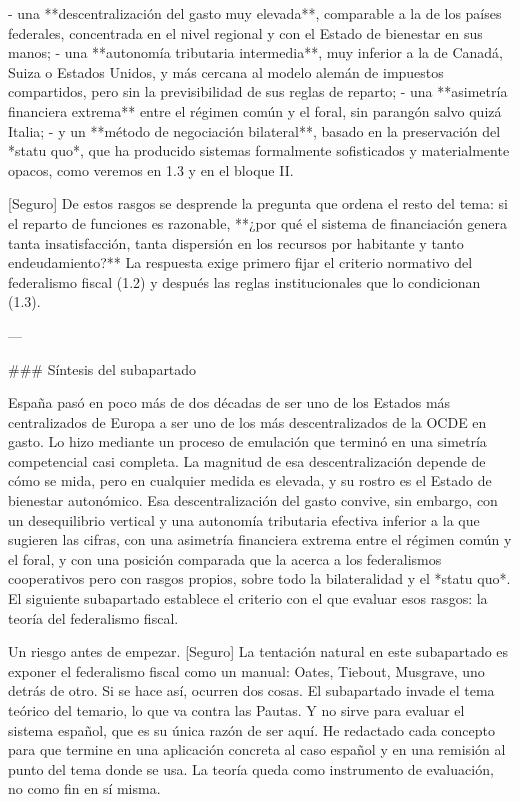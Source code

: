 \documentclass[10pt,a4paper]{article}
\begin{document}
- una **descentralización del gasto muy elevada**, comparable a la de los países federales, concentrada en el nivel regional y con el Estado de bienestar en sus manos;
- una **autonomía tributaria intermedia**, muy inferior a la de Canadá, Suiza o Estados Unidos, y más cercana al modelo alemán de impuestos compartidos, pero sin la previsibilidad de sus reglas de reparto;
- una **asimetría financiera extrema** entre el régimen común y el foral, sin parangón salvo quizá Italia;
- y un **método de negociación bilateral**, basado en la preservación del *statu quo*, que ha producido sistemas formalmente sofisticados y materialmente opacos, como veremos en 1.3 y en el bloque II.

[Seguro] De estos rasgos se desprende la pregunta que ordena el resto del tema: si el reparto de funciones es razonable, **¿por qué el sistema de financiación genera tanta insatisfacción, tanta dispersión en los recursos por habitante y tanto endeudamiento?** La respuesta exige primero fijar el criterio normativo del federalismo fiscal (1.2) y después las reglas institucionales que lo condicionan (1.3).

---

### Síntesis del subapartado

España pasó en poco más de dos décadas de ser uno de los Estados más centralizados de Europa a ser uno de los más descentralizados de la OCDE en gasto. Lo hizo mediante un proceso de emulación que terminó en una simetría competencial casi completa. La magnitud de esa descentralización depende de cómo se mida, pero en cualquier medida es elevada, y su rostro es el Estado de bienestar autonómico. Esa descentralización del gasto convive, sin embargo, con un desequilibrio vertical y una autonomía tributaria efectiva inferior a la que sugieren las cifras, con una asimetría financiera extrema entre el régimen común y el foral, y con una posición comparada que la acerca a los federalismos cooperativos pero con rasgos propios, sobre todo la bilateralidad y el *statu quo*. El siguiente subapartado establece el criterio con el que evaluar esos rasgos: la teoría del federalismo fiscal.


Un riesgo antes de empezar. [Seguro] La tentación natural en este subapartado es exponer el federalismo fiscal como un manual: Oates, Tiebout, Musgrave, uno detrás de otro. Si se hace así, ocurren dos cosas. El subapartado invade el tema teórico del temario, lo que va contra las Pautas. Y no sirve para evaluar el sistema español, que es su única razón de ser aquí. He redactado cada concepto para que termine en una aplicación concreta al caso español y en una remisión al punto del tema donde se usa. La teoría queda como instrumento de evaluación, no como fin en sí misma.
\end{document}
